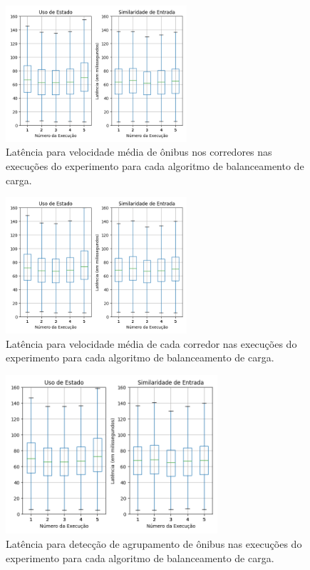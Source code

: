 \begin{figure}[p]
  \centering
\includegraphics[width=0.6\textwidth]{figuras/graphics/boxplot_agg_vel.png}
\caption{Latência para velocidade média de ônibus nos corredores nas execuções do experimento para cada algoritmo de balanceamento de carga.}
\label{fig:boxplot_vel_agg}
\end{figure}

\begin{figure}[p]
\centering
\includegraphics[width=0.6\textwidth]{figuras/graphics/boxplot_agg_corr.png}
 \caption{Latência para velocidade média de cada corredor nas execuções do experimento para cada algoritmo de balanceamento de carga.}
 \label{fig:boxplot_corr_agg}
\end{figure}
\afterpage{\clearpage}
\begin{figure}[p]

\centering
\includegraphics[width=0.7\textwidth]{figuras/graphics/boxplot_agg_BusB.png}
\caption{Latência para detecção de agrupamento de ônibus nas execuções do experimento para cada algoritmo de balanceamento de carga.}
\label{fig:boxplot_BusB_agg}

\end{figure}

